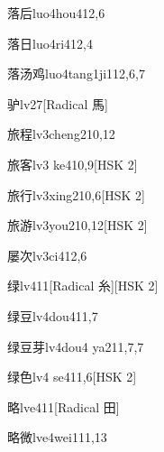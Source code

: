 \begin{entry}{落后}{luo4hou4}{12,6}
\end{entry}

\begin{entry}{落日}{luo4ri4}{12,4}
\end{entry}

\begin{entry}{落汤鸡}{luo4tang1ji1}{12,6,7}
\end{entry}

\begin{entry}{驴}{lv2}{7}[Radical 馬]
\end{entry}

\begin{entry}{旅程}{lv3cheng2}{10,12}
\end{entry}

\begin{entry}{旅客}{lv3 ke4}{10,9}[HSK 2]
\end{entry}

\begin{entry}{旅行}{lv3xing2}{10,6}[HSK 2]
\end{entry}

\begin{entry}{旅游}{lv3you2}{10,12}[HSK 2]
\end{entry}

\begin{entry}{屡次}{lv3ci4}{12,6}
\end{entry}

\begin{entry}{绿}{lv4}{11}[Radical 糸][HSK 2]
\end{entry}

\begin{entry}{绿豆}{lv4dou4}{11,7}
\end{entry}

\begin{entry}{绿豆芽}{lv4dou4 ya2}{11,7,7}
\end{entry}

\begin{entry}{绿色}{lv4 se4}{11,6}[HSK 2]
\end{entry}

\begin{entry}{略}{lve4}{11}[Radical 田]
\end{entry}

\begin{entry}{略微}{lve4wei1}{11,13}
\end{entry}


